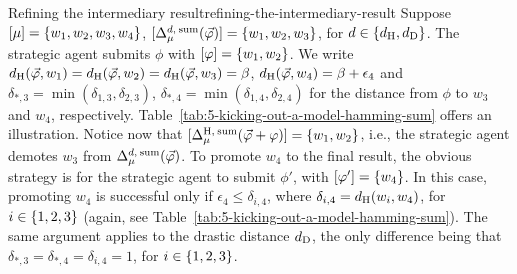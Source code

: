 \begin{xmpl}{Refining the intermediary result}{refining-the-intermediary-result}
	Suppose $[\mu]=\{{w_1,w_2,w_3,w_4}\}$, $[\Delta^{d,\:{\operatorname{sum}}}_{\mu}({\vec{\varphi}})]=\{{w_1,w_2,w_3}\}$,
	for $d\in\{{d_{\operatorname{H}},d_{\operatorname{D}}}\}$.
	The strategic agent submits $\phi$ with $[\varphi]=\{{w_1,w_2}\}$. 
	We write 
	$d_{\operatorname{H}}({\vec{\varphi}},w_1)=d_{\operatorname{H}}({\vec{\varphi}},w_2)=d_{\operatorname{H}}({\vec{\varphi}},w_3)=\beta$,
	$d_{\operatorname{H}}({\vec{\varphi}},w_4)=\beta+\epsilon_4$ and
	$\delta_{\ast,3} = \min(\delta_{1,3},\delta_{2,3})$,
	$\delta_{\ast,4} = \min(\delta_{1,4},\delta_{2,4})$ 
	for the distance from $\phi$ to $w_3$ and $w_4$, respectively.	
	Table~\ref{tab:5-kicking-out-a-model-hamming-sum} offers an illustration.
	Notice now that $[\Delta^{{\operatorname{H}},\:{\operatorname{sum}}}_{\mu}({\vec{\varphi}}+\varphi)]=\{{w_1,w_2}\}$,
	i.e., the strategic agent demotes $w_3$ from $\Delta^{d,\:{\operatorname{sum}}}_{\mu}({\vec{\varphi}})$.
	To promote $w_4$ to the final result, the obvious strategy is for the strategic agent to 
	submit $\phi'$, with $[\varphi']=\{{w_4}\}$. 
	In this case, promoting $w_4$ is successful only if 
	$\epsilon_4\le\delta_{i,4}$, where $\delta_{i,4}=d_{\operatorname{H}}(w_i,w_4)$, for $i\in\{{1,2,3}\}$
	(again, see Table~\ref{tab:5-kicking-out-a-model-hamming-sum}).
	The same argument applies to the drastic distance $d_{\operatorname{D}}$, the only difference being
	that $\delta_{\ast,3} = \delta_{\ast,4} = \delta_{i,4}=1$, for $i\in\{{1,2,3}\}$.
\end{xmpl}



